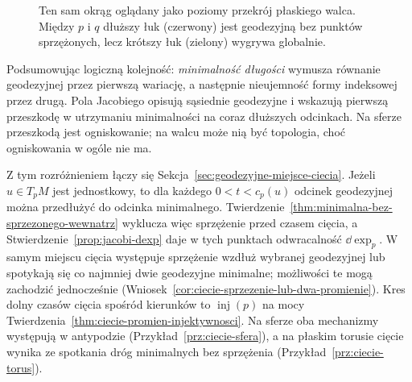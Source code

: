 \begin{figure}[htbp]
\centering
{}
\caption{Ten sam okrąg oglądany jako poziomy przekrój płaskiego walca. Między $p$ i $q$ dłuższy łuk (czerwony) jest geodezyjną bez punktów sprzężonych, lecz krótszy łuk (zielony) wygrywa globalnie.}
\label{fig:jacobi-walec-dwa-luki}
\end{figure}

Podsumowując logiczną kolejność:
\emph{minimalność długości} wymusza równanie
geodezyjnej przez pierwszą wariację, a następnie
nieujemność formy indeksowej przez drugą.
Pola Jacobiego opisują sąsiednie geodezyjne
i wskazują pierwszą przeszkodę w utrzymaniu
minimalności na coraz dłuższych odcinkach.
Na sferze przeszkodą jest ogniskowanie;
na walcu może nią być topologia, choć
ogniskowania w ogóle nie ma.

Z tym rozróżnieniem łączy się Sekcja~\ref{sec:geodezyjne-miejsce-ciecia}.
Jeżeli $u\in T_pM$ jest jednostkowy, to dla każdego
$0<t<c_p(u)$ odcinek geodezyjnej można przedłużyć
do odcinka minimalnego. Twierdzenie~\ref{thm:minimalna-bez-sprzezonego-wewnatrz}
wyklucza więc sprzężenie przed czasem cięcia, a
Stwierdzenie~\ref{prop:jacobi-dexp} daje w tych punktach
odwracalność $\dd\exp_p$. W samym miejscu cięcia
występuje sprzężenie wzdłuż wybranej geodezyjnej lub
spotykają się co najmniej dwie geodezyjne minimalne;
możliwości te mogą
zachodzić jednocześnie (Wniosek~\ref{cor:ciecie-sprzezenie-lub-dwa-promienie}).
Kres dolny czasów cięcia spośród kierunków to
$\operatorname{inj}(p)$ na mocy
Twierdzenia~\ref{thm:ciecie-promien-injektywnosci}.
Na sferze oba mechanizmy występują w antypodzie
(Przykład~\ref{prz:ciecie-sfera}), a na płaskim torusie
cięcie wynika ze spotkania dróg minimalnych bez
sprzężenia (Przykład~\ref{prz:ciecie-torus}).

